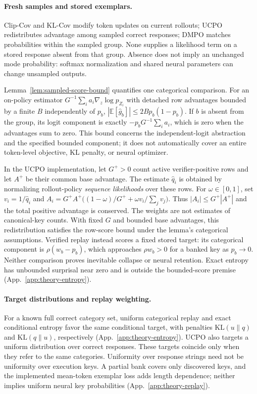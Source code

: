 \documentclass{article}
\newcommand{\1}{\mathbf 1}
\newcommand{\E}{\mathbb E}
\theoremstyle{remark}
\theoremstyle{definition}
\theoremstyle{plain}
\begin{document}
\paragraph{Fresh samples and stored exemplars.}
Clip-Cov and KL-Cov modify token updates on current rollouts; UCPO
redistributes advantage among sampled correct responses; DMPO matches
probabilities within the sampled group. None supplies a likelihood term on
a stored response absent from that group. Absence does not imply an
unchanged mode probability: softmax normalization and shared neural
parameters can change unsampled outputs.

Lemma~\ref{lem:sampled-score-bound} quantifies one categorical comparison.
For an on-policy estimator $G^{-1}\sum_i a_i\nabla_z\log p_{Z_i}$ with
detached row advantages bounded by a finite $B$ independently of $p_b$,
$|\E[\widehat g_b]|\le2Bp_b(1-p_b)$. If $b$ is absent from the group,
its logit component is exactly $-p_bG^{-1}\sum_i a_i$, which is zero when
the advantages sum to zero. This bound concerns the independent-logit
abstraction and the specified bounded component; it does not automatically
cover an entire token-level objective, KL penalty, or neural optimizer.

In the UCPO implementation, let $G^+>0$ count active verifier-positive rows
and let $A^+$ be their common base advantage. The estimate $\hat q_i$ is
obtained by normalizing rollout-policy \emph{sequence likelihoods} over
these rows. For $\omega\in[0,1]$, set $v_i=1/\hat q_i$ and
$A_i=G^+A^+\bigl((1-\omega)/G^++\omega v_i/\sum_jv_j\bigr)$.
Thus $|A_i|\le G^+|A^+|$ and the total positive advantage is conserved.
The weights are not estimates of canonical-key counts. With fixed $G$ and
bounded base advantages, this redistribution satisfies the row-score bound
under the lemma's categorical assumptions. Verified replay instead scores
a fixed stored target: its categorical component is $\rho(w_b-p_b)$,
which approaches $\rho w_b>0$ for a banked key as $p_b\to0$.
Neither comparison proves inevitable collapse or neural retention.
Exact entropy has unbounded surprisal near zero and is outside the bounded-score
premise (App.~\ref{app:theory-entropy}).

\paragraph{Target distributions and replay weighting.}
For a known full correct category set, uniform categorical replay and exact
conditional entropy favor the same conditional target, with penalties
$\mathrm{KL}(u\|q)$ and $\mathrm{KL}(q\|u)$, respectively
(App.~\ref{app:theory-entropy}). UCPO also targets a uniform distribution
over correct responses. These targets coincide only when they refer to the
same categories. Uniformity over response strings need not be uniformity
over execution keys. A partial bank covers only discovered keys, and the
implemented mean-token exemplar loss adds length dependence; neither implies
uniform neural key probabilities (App.~\ref{app:theory-replay}).
\end{document}
